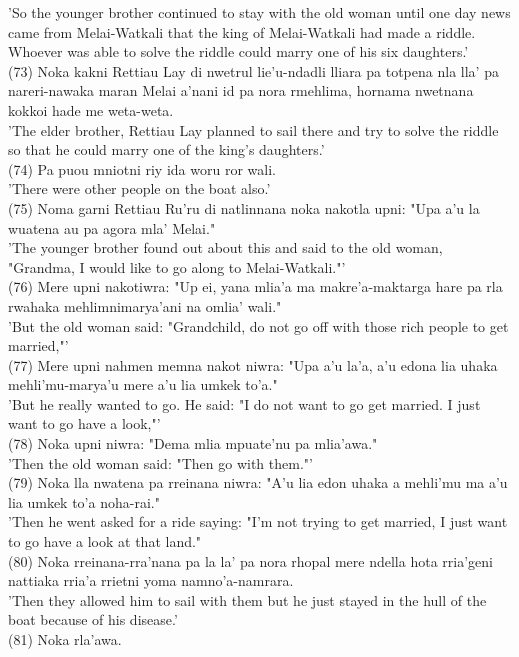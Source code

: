 \documentclass[10pt]{article}
\begin{document}
'So the younger brother continued to stay with the old woman until one day news came from Melai-Watkali that the king of Melai-Watkali had made a riddle. Whoever was able to solve the riddle could marry one of his six daughters.'\\
(73) Noka kakni Rettiau Lay di nwetrul lie'u-ndadli lliara pa totpena nla lla' pa nareri-nawaka maran Melai a'nani id pa nora rmehlima, hornama nwetnana kokkoi hade me weta-weta.\\
'The elder brother, Rettiau Lay planned to sail there and try to solve the riddle so that he could marry one of the king's daughters.'\\
(74) Pa puou mniotni riy ida woru ror wali.\\
'There were other people on the boat also.'\\
(75) Noma garni Rettiau Ru'ru di natlinnana noka nakotla upni: "Upa a'u la wuatena au pa agora mla' Melai."\\
'The younger brother found out about this and said to the old woman, "Grandma, I would like to go along to Melai-Watkali."'\\
(76) Mere upni nakotiwra: "Up ei, yana mlia'a ma makre'a-maktarga hare pa rla rwahaka mehlimnimarya'ani na omlia' wali."\\
'But the old woman said: "Grandchild, do not go off with those rich people to get married,"'\\
(77) Mere upni nahmen memna nakot niwra: "Upa a'u la'a, a'u edona lia uhaka mehli'mu-marya'u mere a'u lia umkek to'a."\\
'But he really wanted to go. He said: "I do not want to go get married. I just want to go have a look,"'\\
(78) Noka upni niwra: "Dema mlia mpuate'nu pa mlia'awa."\\
'Then the old woman said: "Then go with them."'\\
(79) Noka lla nwatena pa rreinana niwra: "A'u lia edon uhaka a mehli'mu ma a'u lia umkek to'a noha-rai."\\
'Then he went asked for a ride saying: "I'm not trying to get married, I just want to go have a look at that land."\\
(80) Noka rreinana-rra'nana pa la la' pa nora rhopal mere ndella hota rria'geni nattiaka rria'a rrietni yoma namno'a-namrara.\\
'Then they allowed him to sail with them but he just stayed in the hull of the boat because of his disease.'\\
(81) Noka rla'awa.\\
\end{document}
